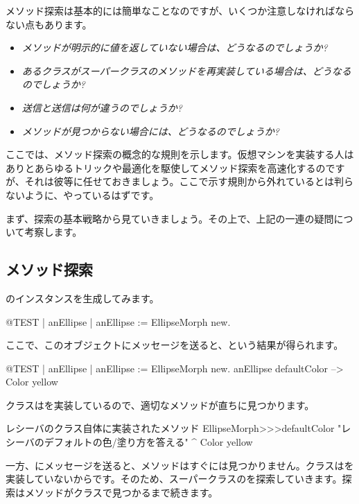 \documentclass[a4paper,10pt,twoside]{book}
\begin{document}
メソッド探索は基本的には簡単なことなのですが、いくつか注意しなければならない点もあります。

\begin{itemize}
  \item \emph{メソッドが明示的に値を返していない場合は、どうなるのでしょうか?}
  \item \emph{あるクラスがスーパークラスのメソッドを再実装している場合は、どうなるのでしょうか?}
  \item \emph{送信と送信は何が違うのでしょうか?}
  \item \emph{メソッドが見つからない場合には、どうなるのでしょうか?}
\end{itemize}

ここでは、メソッド探索の概念的な規則を示します。仮想マシンを実装する人はありとあらゆるトリックや最適化を駆使してメソッド探索を高速化するのですが、それは彼等に任せておきましょう。ここで示す規則から外れているとは判らないように、やっているはずです。

まず、探索の基本戦略から見ていきましょう。その上で、上記の一連の疑問について考察します。

\subsection{メソッド探索}
のインスタンスを生成してみます。
\begin{code}{@TEST | anEllipse |}
anEllipse := EllipseMorph new.
\end{code}
\noindent
ここで、このオブジェクトにメッセージを送ると、という結果が得られます。
\begin{code}{@TEST | anEllipse | anEllipse := EllipseMorph new.}
anEllipse defaultColor --> Color yellow
\end{code}
\noindent
{}クラスはを実装しているので、適切なメソッドが直ちに見つかります。

\begin{method}[defaultColor]{レシーバのクラス自体に実装されたメソッド}
EllipseMorph>>>defaultColor
	"レシーバのデフォルトの色/塗り方を答える"
	^ Color yellow
\end{method}

一方、にメッセージを送ると、メソッドはすぐには見つかりません。クラスはを実装していないからです。そのため、スーパークラスのを探索していきます。探索はメソッドがクラスで見つかるまで続きます。
\end{document}
